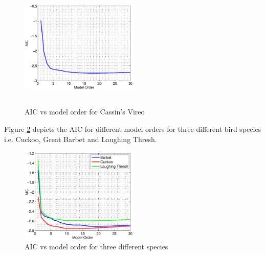 \documentclass[a4paper]{article}
\begin{document}
 
 \begin{figure}[!ht]
	\centering
	\includegraphics[width=0.5\textwidth,height=6cm] {cassins_AIC.eps}
	\caption{AIC vs model order for Cassin's Vireo }   
	\label{fig:AIC_cassins}
\end{figure} 

 
 
Figure \ref{fig:AIC_3} depicts the AIC for different model orders for three different bird species i.e. Cuckoo, Great Barbet and Laughing Thresh. 

 \begin{figure}[!ht]
	\centering
	\includegraphics[width=0.5\textwidth,height=7 cm] {model_order_vs_AIC.eps}
	\caption{AIC vs model order for three different species }   
	\label{fig:AIC_3}
\end{figure} 


 
 
 
\end{document}
